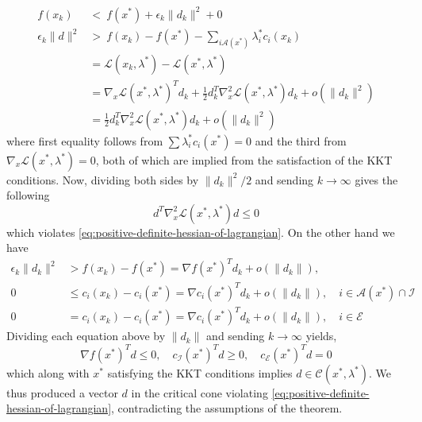 \begin{align*}
    f(x_k)            & <\> f(x^*) + \epsilon_k \|d_k\|^2 + 0                                                                                \\
    \epsilon_k\|d\|^2 & >\> f(x_k) - f(x^*) - \sum_{i\mathcal{A}(x^*)} \lambda^*_i c_i(x_k)                                                  \\
                      & = \mathcal{L}(x_k, \lambda^*) - \mathcal{L}(x^*, \lambda^*)                                                          \\
                      & = \nabla_x\mathcal{L}(x^*,\lambda^*)^T d_k + \frac{1}{2}d_k^T\nabla_x^2\mathcal{L}(x^*, \lambda^*)d_k + o(\|d_k\|^2) \\
                      & = \frac{1}{2}d_k^T\nabla_x^2\mathcal{L}(x^*, \lambda^*)d_k + o(\|d_k\|^2)
\end{align*}
where first equality follows from $\sum \lambda_i^*c_i(x^*) = 0$ and the third from $\nabla_x\mathcal{L}(x^*,\lambda^*) = 0$, both of which are implied from the satisfaction of the KKT conditions.
Now, dividing both sides by $\|d_k\|^2 / 2$ and sending $k\to\infty$ gives the following
\[
    d^T \nabla_x^2\mathcal{L}(x^*, \lambda^*) d \leq 0
\]
which violates \eqref{eq:positive-definite-hessian-of-lagrangian}.
On the other hand we have
\begin{align*}
    \epsilon_k \|d_k\|^2 & > f(x_k) - f(x^*) = \nabla f(x^*)^Td_k + o(\|d_k\|),                                                      \\
    0                    & \leq c_i(x_k) - c_i(x^*) = \nabla c_i(x^*)^T d_k + o(\|d_k\|), \quad i\in \mathcal{A}(x^*)\cap\mathcal{I} \\
    0                    & = c_i(x_k) - c_i(x^*) = \nabla c_i(x^*)^T d_k + o(\|d_k\|), \quad i \in \mathcal{E}
\end{align*}
Dividing each equation above by $\|d_k\|$ and sending $k\to\infty$ yields,
\[
    \nabla f(x^*)^Td \leq 0, \quad c_\mathcal{I}(x^*)^T d \geq 0, \quad c_\mathcal{E}(x^*)^T d = 0
\]
which along with $x^*$ satisfying the KKT conditions implies $d\in \mathcal{C}(x^*, \lambda^*)$.
We thus produced a vector $d$ in the critical cone violating \eqref{eq:positive-definite-hessian-of-lagrangian}, contradicting the assumptions of the theorem.\hfill\sq
